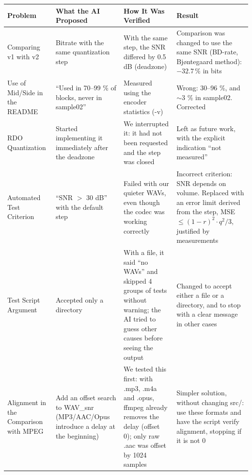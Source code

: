 \begin{table}[H]
\centering
\small
\begin{tabularx}{\textwidth}{@{}p{}p{}p{}X@{}}
\toprule
\textbf{Problem} &
\textbf{What the AI Proposed} &
\textbf{How It Was Verified} &
\textbf{Result} \\
\midrule

Comparing v1 with v2 &
Bitrate with the same quantization step &
With the same step, the SNR differed by 0.5 dB (deadzone) &
Comparison was changed to use the same SNR (BD-rate, Bjøntegaard
method): $-32.7\,\%$ in bits \\

Use of Mid/Side in the README &
``Used in 70--99 \% of blocks, never in sample02'' &
Measured using the encoder statistics (-v) &
Wrong: 30--96 \%, and $\sim$3 \% in sample02. Corrected \\

RDO Quantization &
Started implementing it immediately after the deadzone &
We interrupted it: it had not been requested and the step was closed &
Left as future work, with the explicit indication ``not measured'' \\

Automated Test Criterion &
``SNR $>$ 30 dB'' with the default step &
Failed with our quieter WAVs, even though the codec was working
correctly &
Incorrect criterion: SNR depends on volume. Replaced with an error
limit derived from the step, MSE $\leq (1-r)^2 \cdot q^2/3$,
justified by measurements \\

Test Script Argument &
Accepted only a directory &
With a file, it said ``no WAVs'' and skipped 4 groups of tests
without warning; the AI tried to guess other causes before seeing
the output &
Changed to accept either a file or a directory, and to stop with
a clear message in other cases \\

Alignment in the Comparison with MPEG &
Add an offset search to WAV\_snr (MP3/AAC/Opus introduce a delay
at the beginning) &
We tested this first: with .mp3, .m4a and .opus, ffmpeg already
removes the delay (offset 0); only raw .aac was offset by
1024 samples &
Simpler solution, without changing src/: use these formats and
have the script verify alignment, stopping if it is not 0 \\

\bottomrule
\end{tabularx}
\end{table}

